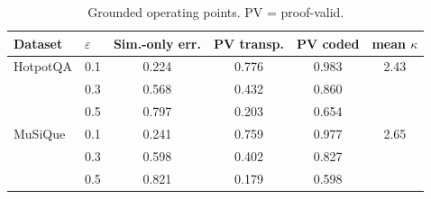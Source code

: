 
\begin{table}[t]
\footnotesize
\caption{Grounded operating points. PV = proof-valid.}
\label{tab:grounded-operating}
\tabcolsep 3pt
\begin{tabular*}{\columnwidth}{@{\extracolsep{\fill}}llcccc@{}}
\toprule
Dataset & $\varepsilon$ & Sim.-only err. & PV transp. & PV coded & mean $\kappa$ \\\hline
HotpotQA & 0.1 & 0.224 & 0.776 & 0.983 & 2.43 \\
 & 0.3 & 0.568 & 0.432 & 0.860 &  \\
 & 0.5 & 0.797 & 0.203 & 0.654 &  \\\hline
MuSiQue & 0.1 & 0.241 & 0.759 & 0.977 & 2.65 \\
 & 0.3 & 0.598 & 0.402 & 0.827 &  \\
 & 0.5 & 0.821 & 0.179 & 0.598 &  \\
\bottomrule
\end{tabular*}
\end{table}
